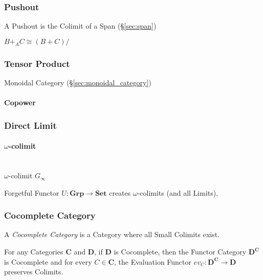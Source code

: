 \subsubsection{Pushout}\label{sec:pushout}

A Pushout is the Colimit of a Span (\S\ref{sec:span})

$B +_A C \cong (B + C)/~$



\subsubsection{Tensor Product}\label{sec:tensor_product}

Monoidal Category (\S\ref{sec:monoidal_category})



\paragraph{Copower}\label{sec:copower}



\subsubsection{Direct Limit}\label{sec:direct_limit}

\paragraph{$\omega$-colimit}\label{sec:omega_colimit}
\hfill \\

$\omega$-colimit $G_\infty$

Forgetful Functor $U : \mathbf{Grp} \rightarrow \mathbf{Set}$ creates
$\omega$-colimits (and all Limits). \cite{awodey06}



\subsubsection{Cocomplete Category}\label{sec:cocomplete_category}

A \emph{Cocomplete Category} is a Category where all Small Colimits
exist.

For any Categories $\mathbf{C}$ and $\mathbf{D}$, if $\mathbf{D}$ is
Cocomplete, then the Functor Category $\mathbf{D^C}$ is Cocomplete and
for every $C \in \mathbf{C}$, the Evaluation Functor $ev_C :
\mathbf{D^C} \rightarrow \mathbf{D}$ preserves Colimits.

